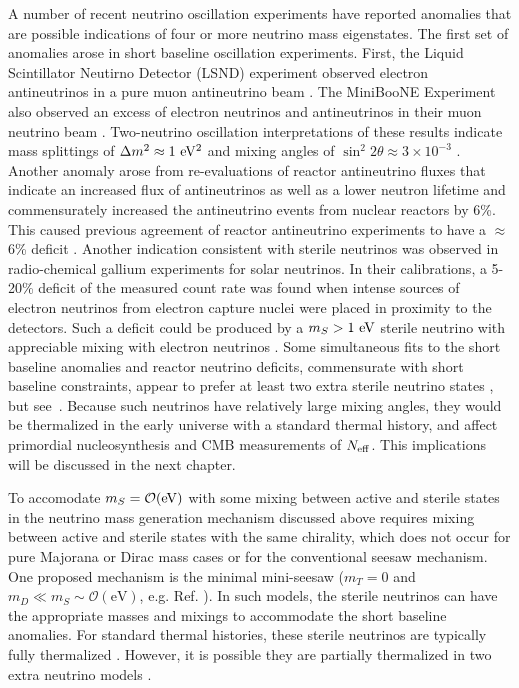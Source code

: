 A number of recent neutrino oscillation experiments have reported anomalies
that are possible indications of four or more neutrino mass eigenstates. The
first set of anomalies arose in short baseline oscillation experiments.
First, the Liquid Scintillator Neutirno Detector (LSND) experiment observed
electron antineutrinos in a pure muon antineutrino
beam \cite{Athanassopoulos:1997pv}. The MiniBooNE Experiment also observed
an excess of electron neutrinos and antineutrinos in their muon
neutrino beam \cite{Aguilar-Arevalo:2013pmq}. Two-neutrino oscillation
interpretations of these results indicate mass splittings of $\Delta m^2
\approx 1\rm\ eV^2$ and mixing angles of $\sin^2 2\theta \approx
3\times 10^{-3}$ \cite{Aguilar-Arevalo:2013pmq}. Another anomaly
arose from re-evaluations of reactor antineutrino fluxes that
indicate an increased flux of antineutrinos as well as a lower
neutron lifetime and commensurately increased the antineutrino events
from nuclear reactors by 6\%. This caused previous agreement of
reactor antineutrino experiments to have a $\approx$6\% deficit
\cite{Mention:2011rk,Huber:2011wv}. Another indication consistent with
sterile neutrinos was observed in radio-chemical gallium experiments for solar
neutrinos. In their calibrations, a 5-20\% deficit of the measured
count rate was found when intense sources of electron neutrinos from
electron capture nuclei were placed in proximity to the
detectors. Such a deficit could be produced by a $m_S >1\rm\ eV$ sterile
neutrino with appreciable mixing with electron neutrinos
\cite{Bahcall:1994bq,Giunti:2010zu}. Some simultaneous fits to the
short baseline anomalies and reactor neutrino deficits, commensurate
with short baseline constraints, appear to prefer at least two extra
sterile neutrino states \cite{Conrad:2012qt,Kopp:2013vaa}, but see~\cite{Giunti:2015mwa}. Because such neutrinos have relatively
large mixing angles, they would be thermalized in the early universe
with a standard thermal history, and affect primordial nucleosynthesis
\cite{Abazajian:2002bj} and CMB measurements of $N_{\rm eff}$.  This implications will be discussed in the next chapter.

To accomodate $m_S = \mathcal{O}({\rm eV})$ with some mixing between active
and sterile states in the neutrino mass generation mechanism discussed
above requires mixing between active and sterile states with the same
chirality, which does not occur for pure Majorana or Dirac mass cases
or for the conventional seesaw mechanism. One proposed mechanism is
the minimal mini-seesaw ($m_T =0$ and $m_D\ll
m_S\sim\mathcal{O}(\mathrm{eV})$,
e.g. Ref.\cite{deGouvea:2011zz,Donini:2012tt} ). In such models, the
sterile neutrinos can have the appropriate masses and mixings to
accommodate the short baseline anomalies. For standard thermal
histories, these sterile neutrinos are typically fully thermalized
\cite{Abazajian:2002bj}. However, it is possible they are partially
thermalized in two extra neutrino models \cite{Jacques:2013xr}.

